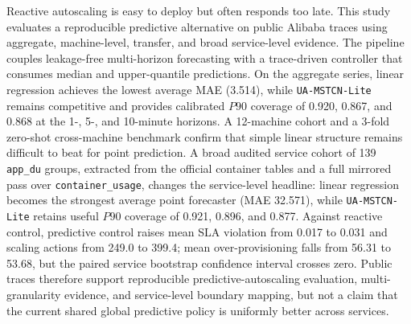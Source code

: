 Reactive autoscaling is easy to deploy but often responds too late. This study evaluates a reproducible predictive alternative on public Alibaba traces using aggregate, machine-level, transfer, and broad service-level evidence. The pipeline couples leakage-free multi-horizon forecasting with a trace-driven controller that consumes median and upper-quantile predictions. On the aggregate series, linear regression achieves the lowest average MAE (3.514), while \texttt{UA-MSTCN-Lite} remains competitive and provides calibrated $P90$ coverage of 0.920, 0.867, and 0.868 at the 1-, 5-, and 10-minute horizons. A 12-machine cohort and a 3-fold zero-shot cross-machine benchmark confirm that simple linear structure remains difficult to beat for point prediction. A broad audited service cohort of 139 \texttt{app\_du} groups, extracted from the official container tables and a full mirrored pass over \texttt{container\_usage}, changes the service-level headline: linear regression becomes the strongest average point forecaster (MAE 32.571), while \texttt{UA-MSTCN-Lite} retains useful $P90$ coverage of 0.921, 0.896, and 0.877. Against reactive control, predictive control raises mean SLA violation from 0.017 to 0.031 and scaling actions from 249.0 to 399.4; mean over-provisioning falls from 56.31 to 53.68, but the paired service bootstrap confidence interval crosses zero. Public traces therefore support reproducible predictive-autoscaling evaluation, multi-granularity evidence, and service-level boundary mapping, but not a claim that the current shared global predictive policy is uniformly better across services.

